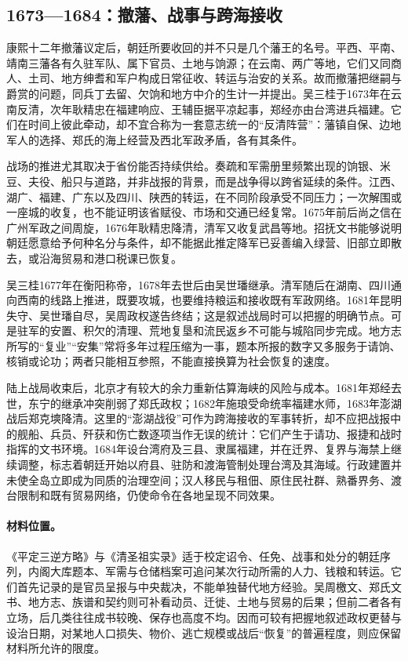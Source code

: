 \subsection{1673—1684：撤藩、战事与跨海接收}

康熙十二年撤藩议定后，朝廷所要收回的并不只是几个藩王的名号。平西、平南、靖南三藩各有久驻军队、属下官员、土地与饷源；在云南、两广等地，它们又同商人、土司、地方绅耆和军户构成日常征收、转运与治安的关系。故而撤藩把继嗣与爵赏的问题，同兵丁去留、欠饷和地方中介的生计一并提出。吴三桂于1673年在云南反清，次年耿精忠在福建响应、王辅臣据平凉起事，郑经亦由台湾进兵福建。它们在时间上彼此牵动，却不宜合称为一套意志统一的“反清阵营”：藩镇自保、边地军人的选择、郑氏的海上经营及西北军政矛盾，各有其条件。

战场的推进尤其取决于省份能否持续供给。奏疏和军需册里频繁出现的饷银、米豆、夫役、船只与道路，并非战报的背景，而是战争得以跨省延续的条件。江西、湖广、福建、广东以及四川、陕西的转运，在不同阶段承受不同压力；一次解围或一座城的收复，也不能证明该省赋役、市场和交通已经复常。1675年前后尚之信在广州军政之间周旋，1676年耿精忠降清，清军又收复武昌等地。招抚文书能够说明朝廷愿意给予何种名分与条件，却不能据此推定降军已妥善编入绿营、旧部立即散去，或沿海贸易和港口税课已恢复。

吴三桂1677年在衡阳称帝，1678年去世后由吴世璠继承。清军随后在湖南、四川通向西南的线路上推进，既要攻城，也要维持粮运和接收既有军政网络。1681年昆明失守、吴世璠自尽，吴周政权遂告终结；这是叙述战局时可以把握的明确节点。可是驻军的安置、积欠的清理、荒地复垦和流民返乡不可能与城陷同步完成。地方志所写的“复业”“安集”常将多年过程压缩为一事，题本所报的数字又多服务于请饷、核销或论功；两者只能相互参照，不能直接换算为社会恢复的速度。

陆上战局收束后，北京才有较大的余力重新估算海峡的风险与成本。1681年郑经去世，东宁的继承冲突削弱了郑氏政权；1682年施琅受命统率福建水师，1683年澎湖战后郑克塽降清。这里的“澎湖战役”可作为跨海接收的军事转折，却不应把战报中的舰船、兵员、歼获和伤亡数逐项当作无误的统计：它们产生于请功、报捷和战时指挥的文书环境。1684年设台湾府及三县、隶属福建，并在迁界、复界与海禁上继续调整，标志着朝廷开始以府县、驻防和渡海管制处理台湾及其海域。行政建置并未使全岛立即成为同质的治理空间；汉人移民与租佃、原住民社群、熟番界务、渡台限制和既有贸易网络，仍使命令在各地呈现不同效果。

\paragraph{材料位置。} 《平定三逆方略》与《清圣祖实录》适于校定诏令、任免、战事和处分的朝廷序列，内阁大库题本、军需与仓储档案可追问某次行动所需的人力、钱粮和转运。它们首先记录的是官员呈报与中央裁决，不能单独替代地方经验。吴周檄文、郑氏文书、地方志、族谱和契约则可补看动员、迁徙、土地与贸易的后果；但前二者各有立场，后几类往往成书较晚、保存也高度不均。因而可较有把握地叙述政权更替与设治日期，对某地人口损失、物价、逃亡规模或战后“恢复”的普遍程度，则应保留材料所允许的限度。




